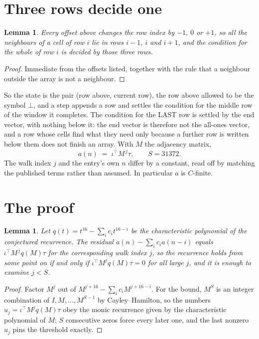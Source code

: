 \documentclass[11pt,a4paper]{article}
\theoremstyle{plain}
\newtheorem{lemma}[theorem]{Lemma}
\theoremstyle{definition}
\begin{document}
\section{Three rows decide one}

\begin{lemma}\label{lem:win}
Every offset above changes the row index by $-1$, $0$ or $+1$, so all the neighbours of a cell
of row $i$ lie in rows $i-1$, $i$ and $i+1$, and the condition for the whole of row $i$ is
decided by those three rows.
\end{lemma}

\begin{proof}
Immediate from the offsets listed, together with the rule that a neighbour outside the array is
not a neighbour.
\end{proof}

So the state is the pair (row above, current row), the row above allowed to be the symbol
$\bot$, and a step appends a row and settles the condition for the middle row of the window it
completes. The condition for the LAST row is settled by the end vector, with nothing below it:
the end vector is therefore not the all-ones vector, and a row whose cells find what they need
only because a further row is written below them does not finish an array. With $M$ the
adjacency matrix,
\[
a(n)\;=\;\iota^{\!\top}M^{\,j}\tau ,\qquad S=31372.
\]
The walk index $j$ and the entry's own $n$ differ by a constant, read off by matching the
published terms rather than assumed. In particular $a$ is $C$-finite.

\section{The proof}

\begin{lemma}\label{lem:crit}
Let $q(t)=t^{16}-\sum_i c_it^{16-i}$ be the characteristic polynomial of the
conjectured recurrence. The residual $a(n)-\sum_ic_ia(n-i)$ equals
$\iota^{\!\top}M^{\,j}q(M)\tau$ for the corresponding walk index $j$, so the recurrence
holds from some point on if and only if $\iota^{\!\top}M^{j}q(M)\tau=0$ for all large $j$,
and it is enough to examine $j<S$.
\end{lemma}

\begin{proof}
Factor $M^{j}$ out of $M^{j+16}-\sum_ic_iM^{j+16-i}$. For the bound, $M^{S}$
is an integer combination of $I,M,\dots,M^{S-1}$ by Cayley--Hamilton, so the numbers
$u_j=\iota^{\!\top}M^{j}q(M)\tau$ obey the monic recurrence given by the characteristic
polynomial of $M$; $S$ consecutive zeros force every later one, and the last nonzero $u_j$
pins the threshold exactly.
\end{proof}
\end{document}

